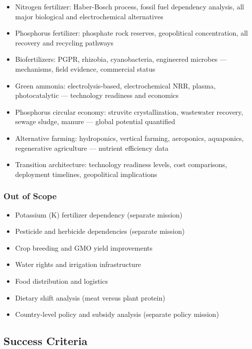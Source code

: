 \documentclass[11pt,letterpaper]{article}
\begin{document}
\begin{itemize}[leftmargin=1.5em]
  \item Nitrogen fertilizer: Haber-Bosch process, fossil fuel dependency analysis, all major biological and electrochemical alternatives
  \item Phosphorus fertilizer: phosphate rock reserves, geopolitical concentration, all recovery and recycling pathways
  \item Biofertilizers: PGPR, rhizobia, cyanobacteria, engineered microbes --- mechanisms, field evidence, commercial status
  \item Green ammonia: electrolysis-based, electrochemical NRR, plasma, photocatalytic --- technology readiness and economics
  \item Phosphorus circular economy: struvite crystallization, wastewater recovery, sewage sludge, manure --- global potential quantified
  \item Alternative farming: hydroponics, vertical farming, aeroponics, aquaponics, regenerative agriculture --- nutrient efficiency data
  \item Transition architecture: technology readiness levels, cost comparisons, deployment timelines, geopolitical implications
\end{itemize}

\subsubsection{Out of Scope}

\begin{itemize}[leftmargin=1.5em]
  \item Potassium (K) fertilizer dependency (separate mission)
  \item Pesticide and herbicide dependencies (separate mission)
  \item Crop breeding and GMO yield improvements
  \item Water rights and irrigation infrastructure
  \item Food distribution and logistics
  \item Dietary shift analysis (meat versus plant protein)
  \item Country-level policy and subsidy analysis (separate policy mission)
\end{itemize}

\subsection{Success Criteria}
\end{document}
